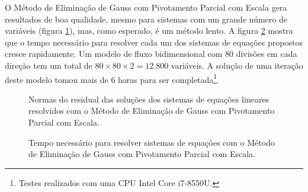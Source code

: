 \documentclass[final,5p]{elsarticle}
\numberwithin{equation}{section}
\begin{document}
        O Método de Eliminação de Gauss com Pivotamento Parcial com Escala gera resultados de boa qualidade, mesmo para sistemas com um grande número de variáveis (figura \ref{fig:errodois}), mas, como esperado, é um método lento. A figura \ref{fig:tempo} mostra que o tempo necessário para resolver cada um dos sistemas de equações propostos cresce rapidamente. Um modelo de fluxo bidimensional com 80 divisões em cada direção tem um total de $80 \times 80 \times 2 = 12.800$ variáveis. A solução de uma iteração deste modelo tomou mais de 6 horas para ser completada\footnote{Testes realizados com uma CPU Intel Core i7-8550U.}.

        \begin{figure}[hbt!]
            \caption{Normas do residual das soluções dos sistemas de equações lineares resolvidos com o Método de Eliminação de Gauss com Pivotamento Parcial com Escala.}
            \label{fig:errodois}
        \end{figure}

        \begin{figure}[hbt!]
            \caption{Tempo necessário para resolver sistemas de equações com o Método de Eliminação de Gauss com Pivotamento Parcial com Escala.}
            \label{fig:tempo}
        \end{figure}
\end{document}

